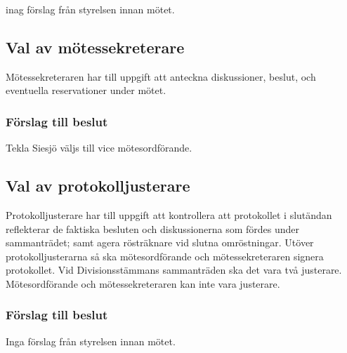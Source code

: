 \documentclass[protokoll]{dvd}
\begin{document}
\begin{attsatser}
    \item inag förslag från styrelsen innan mötet.
\end{attsatser}

\subsection{Val av mötessekreterare}

Mötessekreteraren har till uppgift att anteckna diskussioner, beslut, och eventuella reservationer under mötet.

\subsubsection*{Förslag till beslut}

\begin{attsatser}
    \item Tekla Siesjö väljs till vice mötesordförande.
\end{attsatser}

\subsection{Val av protokolljusterare}

Protokolljusterare har till uppgift att kontrollera att protokollet i slutändan reflekterar de faktiska besluten och diskussionerna som fördes under sammanträdet; samt agera rösträknare vid slutna omröstningar.
Utöver protokolljusterarna så ska mötesordförande och mötessekreteraren signera protokollet.
Vid Divisionsstämmans sammanträden ska det vara två justerare.
Mötesordförande och mötessekreteraren kan inte vara justerare.

\subsubsection*{Förslag till beslut}

\begin{attsatser}
    \item Inga förslag från styrelsen innan mötet.
\end{attsatser}

\newpage

\end{document}
